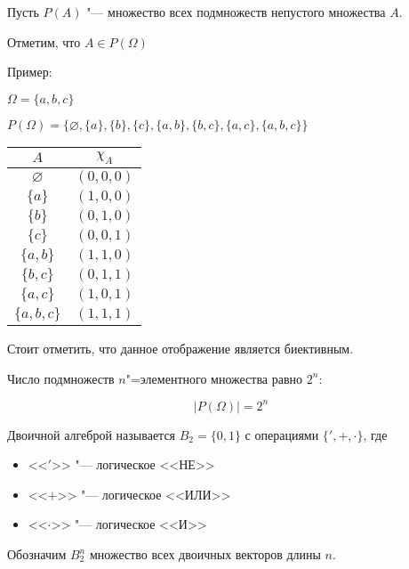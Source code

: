 Пусть $P(A)$ "--- множество всех подмножеств непустого множества $A$. 

Отметим, что $A \in P(\Omega)$

Пример:

$\Omega = \{a, b, c\}$

$P(\Omega) = 
\{ \varnothing, \{a\}, \{b\}, \{c\}, \{a, b\}, \{b, c\}, \{a, c\}, \{a, b, c\} \}$
\begin{center}
    \begin{tabularx}{0.2\textwidth}{c|c}
        $A$ & $\chi_A$ \\ \hline
        $\varnothing$ & $(0, 0, 0)$ \\
        $\{ a \}$ & $(1, 0, 0)$ \\  
        $\{ b \}$ & $(0, 1, 0)$ \\  
        $\{ c \}$ & $(0, 0, 1)$ \\  
        $\{ a,b \}$ & $(1, 1, 0)$ \\  
        $\{ b,c \}$ & $(0, 1, 1)$ \\  
        $\{ a,c \}$ & $(1, 0, 1)$ \\  
        $\{ a,b,c \}$ & $(1, 1, 1)$ \\  
    \end{tabularx}    
\end{center}

Стоит отметить, что данное отображение является биективным. 

\begin{theorem}
    Число подмножеств $n$"=элементного множества равно $2^n$:

    \begin{equation*}
        |P(\Omega)| = 2^n
    \end{equation*}
    
\end{theorem}

Двоичной алгеброй называется $B_2 = \{ 0, 1\}$ с операциями $\{', +, \cdot\}$, где


\begin{itemize}
    \item <<$'$>> "--- логическое <<НЕ>>
    \item <<$+$>> "--- логическое <<ИЛИ>>
    \item <<$\cdot$>> "--- логическое <<И>>
\end{itemize}


Обозначим $B_2^n$ множество всех двоичных векторов длины $n$.

